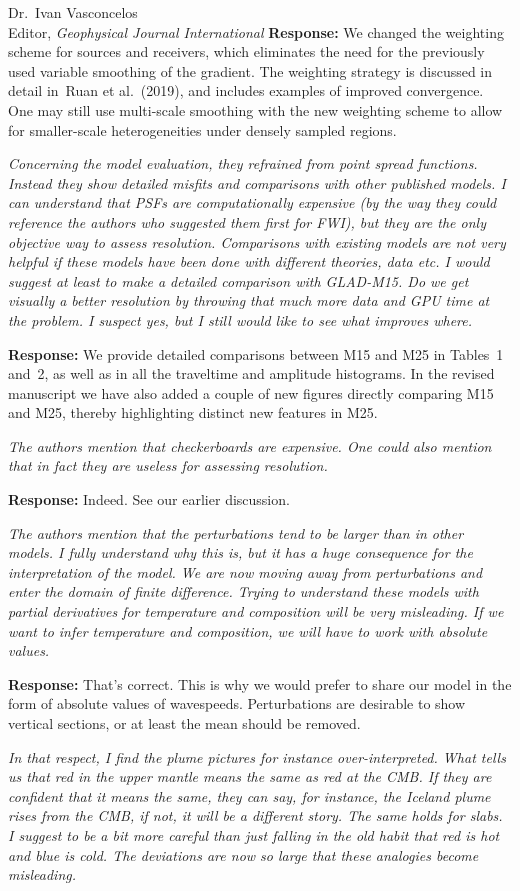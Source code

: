 \documentclass[11pt,a4paper]{letter}
\newcommand{\response}[1]{\textbf{Response:} #1}
\newcommand{\rev}[1]{{\it{#1}}}
\begin{document}
\begin{letter}{Dr.~Ivan Vasconcelos\\
Editor, \textit{Geophysical Journal International}}
\response{We changed the weighting scheme for sources and receivers,
which eliminates the need for the previously used variable smoothing of the gradient.
The weighting strategy is discussed in detail in~Ruan et al.~(2019), and includes examples of improved convergence.
One may still use multi-scale smoothing with the new weighting scheme to allow for smaller-scale heterogeneities under densely sampled regions.
}

\rev{Concerning the model evaluation, they refrained from point spread functions. Instead they show detailed misfits and comparisons with other published models.
I can understand that PSFs are computationally expensive (by the way they could reference the authors who suggested them first for FWI), but they are the only objective way to assess resolution.
Comparisons with existing models are not very helpful if these models have been done with different theories, data etc.
I would suggest at least to make a detailed comparison with GLAD-M15. Do we get visually a better resolution by throwing that much more data and GPU time at the problem. I suspect yes, but I still would like to see what improves where. 
}

\response{We provide detailed comparisons between M15 and M25 in Tables~1 and~2, as well as in all the traveltime and amplitude histograms.
In the revised manuscript we have also added a couple of new figures directly comparing M15 and M25, thereby highlighting distinct new features in M25.}

\rev{The authors mention that checkerboards are expensive. One could also mention that in fact they are useless for assessing resolution.
}

\response{Indeed. See our earlier discussion.}

\rev{The authors mention that the perturbations tend to be larger than in other models. I fully understand why this is, but it has a huge consequence for the interpretation of the model. We are now moving away from perturbations and enter the domain of finite difference. Trying to understand these models with partial derivatives for temperature and composition will be very misleading. If we want to infer temperature and composition, we will have to work with absolute values.
}

\response{That's correct. This is why we would prefer to share our model in the form of absolute values of wavespeeds.
Perturbations are desirable to show vertical sections, or at least the mean should be removed.
}

\rev{In that respect, I find the plume pictures for instance over-interpreted. What tells us that red in the upper mantle means the same as red at the CMB.
If they are confident that it means the same, they can say, for instance, the Iceland plume rises from the CMB, if not, it will be a different story.
The same holds for slabs. I suggest to be a bit more careful than just falling in the old habit that red is hot and blue is cold. The deviations are now so large that these analogies become misleading.
}


\end{letter}
\end{document}
